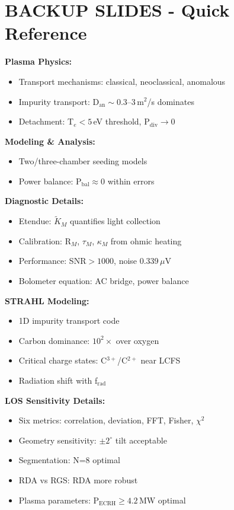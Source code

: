 \documentclass[11pt,a4paper]{article}
\begin{document}
\newpage
\section*{BACKUP SLIDES - Quick Reference}

\textbf{Plasma Physics:}
\begin{itemize}
\item Transport mechanisms: classical, neoclassical, anomalous
\item Impurity transport: D$_{\text{an}}\sim0.3$--3\,m$^2$/s dominates
\item Detachment: T$_e < 5$\,eV threshold, P$_{\text{div}} \rightarrow 0$
\end{itemize}

\textbf{Modeling \& Analysis:}
\begin{itemize}
\item Two/three-chamber seeding models
\item Power balance: P$_{\text{bal}} \approx 0$ within errors
\end{itemize}

\textbf{Diagnostic Details:}
\begin{itemize}
\item Etendue: $\widetilde{K}_M$ quantifies light collection
\item Calibration: R$_M$, $\tau_M$, $\kappa_M$ from ohmic heating
\item Performance: SNR$>1000$, noise 0.339\,$\mu$V
\item Bolometer equation: AC bridge, power balance
\end{itemize}

\textbf{STRAHL Modeling:}
\begin{itemize}
\item 1D impurity transport code
\item Carbon dominance: $10^2\times$ over oxygen
\item Critical charge states: C$^{3+}$/C$^{2+}$ near LCFS
\item Radiation shift with f$_{\text{rad}}$
\end{itemize}

\textbf{LOS Sensitivity Details:}
\begin{itemize}
\item Six metrics: correlation, deviation, FFT, Fisher, $\chi^2$
\item Geometry sensitivity: $\pm2^\circ$ tilt acceptable
\item Segmentation: N=8 optimal
\item RDA vs RGS: RDA more robust
\item Plasma parameters: P$_{\text{ECRH}}\geq4.2$\,MW optimal
\end{itemize}
\end{document}
